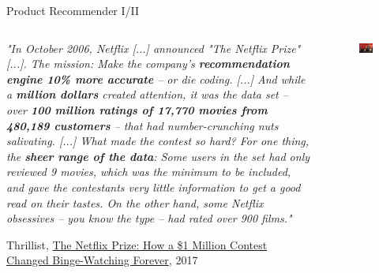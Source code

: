 \documentclass[main.tex]{subfiles}
\begin{document}
    \begin{frame}{Product Recommender I/II}
        \begin{columns}
            \begin{column}{.6\textwidth}
                \begin{justify}
                    \textit{"In October 2006, Netflix [...] announced "The Netflix Prize" [...]. The mission: Make the company's \textbf{recommendation engine 10\% more accurate} -- or die coding. [...] And while a \textbf{million dollars} created attention, it was the data set -- over \textbf{100 million ratings of 17,770 movies from 480,189 customers} -- that had number-crunching nuts salivating. [...] What made the contest so hard? For one thing, the \textbf{sheer range of the data}: Some users in the set had only reviewed 9 movies, which was the minimum to be included, and gave the contestants very little information to get a good read on their tastes. On the other hand, some Netflix obsessives -- you know the type -- had rated over 900 films."}
                    \vspace*{1mm}
                    
                    Thrillist, \href{https://www.thrillist.com/entertainment/nation/the-netflix-prize}{The Netflix Prize: How a \$1 Million Contest Changed Binge-Watching Forever}, 2017
                \end{justify}
            \end{column}
            \begin{column}{.4\textwidth}
                \begin{figure}
                    \label{fig:netflix-prize}
                    \includegraphics[width=\textwidth]{figures/external/netflix-prize.jpg}
                \end{figure}
            \end{column}
        \end{columns}
    \end{frame}
    
\end{document}
